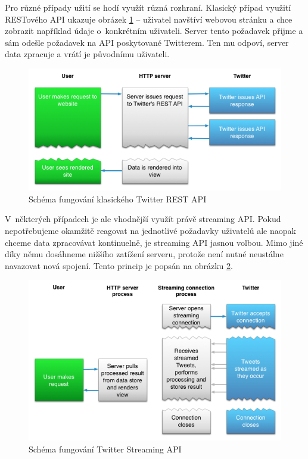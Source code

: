 \documentclass[thesis=B,czech]{FITthesis}[2012/06/26]
\begin{document}
	Pro různé případy užití se hodí využít různá rozhraní. Klasický případ využití RESTového API ukazuje obrázek \ref{fig:twitter_rest} -- uživatel navštíví webovou stránku a chce zobrazit například údaje o~konkrétním uživateli. Server tento požadavek přijme a sám odešle požadavek na API poskytované Twitterem. Ten mu odpoví, server data zpracuje a vrátí je původnímu uživateli. 

\begin{figure}[h!]
   	\centering
   	\includegraphics[width=1\textwidth]{images/twitter-rest.png}
   	\caption{Schéma fungování klasického Twitter REST API\cite{twitter-rest-stream}}
   	\label{fig:twitter_rest}
\end{figure}

	V~některých případech je ale vhodnější využít právě streaming API. Pokud nepotřebujeme okamžitě reagovat na jednotlivé požadavky uživatelů ale naopak chceme data zpracovávat kontinuelně, je streaming API jasnou volbou. Mimo jiné díky němu dosáhneme nižšího zatížení serveru, protože není nutné neustálne navazovat nová spojení. Tento princip je popsán na obrázku \ref{fig:twitter_streaming}. 

\begin{figure}[h!]
   	\centering
   	\includegraphics[width=1\textwidth]{images/twitter-streaming.png}
   	\caption{Schéma fungování Twitter Streaming API\cite{twitter-rest-stream}}
   	\label{fig:twitter_streaming}
\end{figure}
\end{document}

